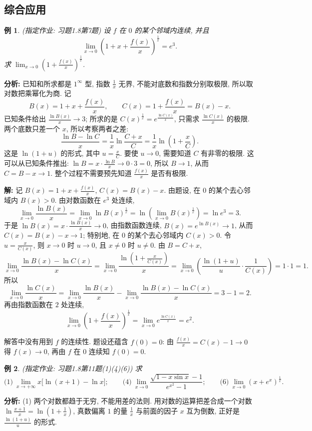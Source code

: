 \documentclass[UTF8,openany]{ctexbook}
\theoremstyle{chinesetextbook}
\newtheorem{example}{例}[section]
\newenvironment{cnsolution}{\par\indent\textbf{解:} \ignorespaces}{\par}
\begin{document}
\subsection{综合应用}
\begin{example}
\textnormal{(指定作业: 习题1.8第7题)} 设 $f$ 在 $0$ 的某个邻域内连续, 并且
\[
\lim_{x\to0}\left(1+x+\frac{f(x)}x\right)^{\frac1x}=e^3.
\]
求 $\displaystyle\lim_{x\to0}\left(1+\frac{f(x)}x\right)^{\frac1x}$.
\end{example}
\par\indent\textbf{分析:} 已知和所求都是 $1^\infty$ 型, 指数 $\displaystyle\frac1x$ 无界, 不能对底数和指数分别取极限, 所以取对数把乘幂化为商. 记
\[
B(x)=1+x+\frac{f(x)}x,\qquad C(x)=1+\frac{f(x)}x=B(x)-x.
\]
已知条件给出 $\displaystyle\frac{\ln B(x)}x\to3$; 所求的是 $\displaystyle C(x)^{\frac1x}=e^{\frac{\ln C(x)}x}$, 只需求 $\displaystyle\frac{\ln C(x)}x$ 的极限. 两个底数只差一个 $x$, 所以考察两者之差:
\[
\frac{\ln B-\ln C}x=\frac1x\ln\frac{C+x}C=\frac1x\ln\left(1+\frac xC\right).
\]
这是 $\ln(1+u)$ 的形式, 其中 $\displaystyle u=\frac xC$. 要使 $u\to0$, 需要知道 $C$ 有非零的极限. 这可以从已知条件推出: $\displaystyle\ln B=x\cdot\frac{\ln B}x\to0\cdot3=0$, 所以 $B\to1$, 从而 $C=B-x\to1$. 整个过程不需要预先知道 $\displaystyle\frac{f(x)}x$ 是否有极限.
\begin{cnsolution}
记 $\displaystyle B(x)=1+x+\frac{f(x)}x$, $C(x)=B(x)-x$. 由题设, 在 $0$ 的某个去心邻域内 $B(x)>0$. 由对数函数在 $e^3$ 处连续,
\[
\lim_{x\to0}\frac{\ln B(x)}x=\lim_{x\to0}\ln B(x)^{\frac1x}=\ln\left(\lim_{x\to0}B(x)^{\frac1x}\right)=\ln e^3=3.
\]
于是 $\displaystyle\ln B(x)=x\cdot\frac{\ln B(x)}x\to0$, 由指数函数连续, $B(x)=e^{\ln B(x)}\to1$, 从而 $C(x)=B(x)-x\to1$; 特别地, 在 $0$ 的某个去心邻域内 $C(x)>0$. 令 $\displaystyle u=\frac x{C(x)}$, 则 $x\to0$ 时 $u\to0$, 且 $x\ne0$ 时 $u\ne0$. 由 $B=C+x$,
\[
\lim_{x\to0}\frac{\ln B(x)-\ln C(x)}x=\lim_{x\to0}\frac{\ln\left(1+\frac x{C(x)}\right)}x=\lim_{x\to0}\left(\frac{\ln(1+u)}u\cdot\frac1{C(x)}\right)=1\cdot1=1.
\]
所以
\[
\lim_{x\to0}\frac{\ln C(x)}x=\lim_{x\to0}\frac{\ln B(x)}x-\lim_{x\to0}\frac{\ln B(x)-\ln C(x)}x=3-1=2.
\]
再由指数函数在 $2$ 处连续,
\[
\lim_{x\to0}\left(1+\frac{f(x)}x\right)^{\frac1x}=\lim_{x\to0}e^{\frac{\ln C(x)}x}=e^2.
\]
\end{cnsolution}
解答中没有用到 $f$ 的连续性. 题设还蕴含 $f(0)=0$: 由 $\displaystyle\frac{f(x)}x=C(x)-1\to0$ 得 $f(x)\to0$, 再由 $f$ 在 $0$ 连续知 $f(0)=0$.
\begin{example}
\textnormal{(指定作业: 习题1.8第11题(1)(4)(6))} 求
\[
\text{(1)}\ \lim_{x\to+\infty}x\bigl[\ln(x+1)-\ln x\bigr];\qquad\text{(4)}\ \lim_{x\to0}\frac{\sqrt{1-x\sin x}-1}{e^{x^2}-1};\qquad\text{(6)}\ \lim_{x\to0}\left(x+e^x\right)^{\frac1x}.
\]
\end{example}
\par\indent\textbf{分析:} (1) 两个对数都趋于无穷, 不能用差的法则. 用对数的运算把差合成一个对数 $\displaystyle\ln\frac{x+1}x=\ln\left(1+\frac1x\right)$, 真数偏离 $1$ 的量 $\displaystyle\frac1x$ 与前面的因子 $x$ 互为倒数, 正好是 $\displaystyle\frac{\ln(1+u)}u$ 的形式.
\end{document}
